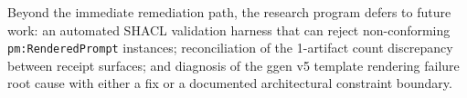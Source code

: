 Beyond the immediate remediation path, the research program defers to future work: an
automated SHACL validation harness that can reject non-conforming \texttt{pm:RenderedPrompt}
instances; reconciliation of the 1-artifact count discrepancy between receipt surfaces;
and diagnosis of the ggen v5 template rendering failure root cause with either a fix or
a documented architectural constraint boundary.
